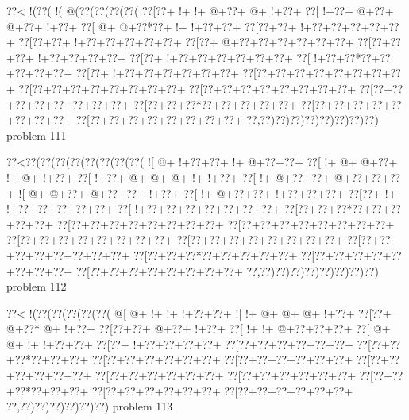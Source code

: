 \vbox{\vbox{\goo
\0??<\- !(\0??(\- !(\- @(\0??(\0??(\0??(\0??(
\0??[\0??+\- !+\- !+\- @+\0??+\- @+\- !+\0??+
\0??[\- !+\0??+\- @+\0??+\- @+\0??+\- !+\0??+
\0??[\- @+\- @+\0??*\0??+\- !+\- !+\0??+\0??+
\0??[\0??+\0??+\- !+\0??+\0??+\0??+\0??+\0??+
\0??[\0??+\0??+\- !+\0??+\0??+\0??+\0??+\0??+
\0??[\0??+\- @+\0??+\0??+\0??+\0??+\0??+\0??+
\0??[\0??+\0??+\0??+\- !+\0??+\0??+\0??+\0??+
\0??[\0??+\- !+\0??+\0??+\0??+\0??+\0??+\0??+
\0??[\- !+\0??+\0??*\0??+\0??+\0??+\0??+\0??+
\0??[\0??+\- !+\0??+\0??+\0??+\0??+\0??+\0??+
\0??[\0??+\0??+\0??+\0??+\0??+\0??+\0??+\0??+
\0??[\0??+\0??+\0??+\0??+\0??+\0??+\0??+\0??+
\0??[\0??+\0??+\0??+\0??+\0??+\0??+\0??+\0??+
\0??[\0??+\0??+\0??+\0??+\0??+\0??+\0??+\0??+
\0??[\0??+\0??+\0??*\0??+\0??+\0??+\0??+\0??+
\0??[\0??+\0??+\0??+\0??+\0??+\0??+\0??+\0??+
\0??[\0??+\0??+\0??+\0??+\0??+\0??+\0??+\0??+
\0??,\0??)\0??)\0??)\0??)\0??)\0??)\0??)\0??)
}
\hfil problem 111\hfil\break
}

\vbox{\vbox{\goo
\0??<\0??(\0??(\0??(\0??(\0??(\0??(\0??(\0??(
\- ![\- @+\- !+\0??+\0??+\- !+\- @+\0??+\0??+
\0??[\- !+\- @+\- @+\0??+\- !+\- @+\- !+\0??+
\0??[\- !+\0??+\- @+\- @+\- @+\- !+\- !+\0??+
\0??[\- !+\- @+\0??+\0??+\- @+\0??+\0??+\0??+
\- ![\- @+\- @+\0??+\- @+\0??+\0??+\- !+\0??+
\0??[\- !+\- @+\0??+\0??+\- !+\0??+\0??+\0??+
\0??[\0??+\- !+\- !+\0??+\0??+\0??+\0??+\0??+
\0??[\- !+\0??+\0??+\0??+\0??+\0??+\0??+\0??+
\0??[\0??+\0??+\0??*\0??+\0??+\0??+\0??+\0??+
\0??[\0??+\0??+\0??+\0??+\0??+\0??+\0??+\0??+
\0??[\0??+\0??+\0??+\0??+\0??+\0??+\0??+\0??+
\0??[\0??+\0??+\0??+\0??+\0??+\0??+\0??+\0??+
\0??[\0??+\0??+\0??+\0??+\0??+\0??+\0??+\0??+
\0??[\0??+\0??+\0??+\0??+\0??+\0??+\0??+\0??+
\0??[\0??+\0??+\0??*\0??+\0??+\0??+\0??+\0??+
\0??[\0??+\0??+\0??+\0??+\0??+\0??+\0??+\0??+
\0??[\0??+\0??+\0??+\0??+\0??+\0??+\0??+\0??+
\0??,\0??)\0??)\0??)\0??)\0??)\0??)\0??)\0??)
}
\hfil problem 112\hfil\break
}

\vbox{\vbox{\goo
\0??<\- !(\0??(\0??(\0??(\0??(\0??(
\- @[\- @+\- !+\- !+\- !+\0??+\0??+
\- ![\- !+\- @+\- @+\- @+\- !+\0??+
\0??[\0??+\- @+\0??*\- @+\- !+\0??+
\0??[\0??+\0??+\- @+\0??+\- !+\0??+
\0??[\- !+\- !+\- @+\0??+\0??+\0??+
\0??[\- @+\- @+\- !+\- !+\0??+\0??+
\0??[\0??+\- !+\0??+\0??+\0??+\0??+
\0??[\0??+\0??+\0??+\0??+\0??+\0??+
\0??[\0??+\0??+\0??*\0??+\0??+\0??+
\0??[\0??+\0??+\0??+\0??+\0??+\0??+
\0??[\0??+\0??+\0??+\0??+\0??+\0??+
\0??[\0??+\0??+\0??+\0??+\0??+\0??+
\0??[\0??+\0??+\0??+\0??+\0??+\0??+
\0??[\0??+\0??+\0??+\0??+\0??+\0??+
\0??[\0??+\0??+\0??*\0??+\0??+\0??+
\0??[\0??+\0??+\0??+\0??+\0??+\0??+
\0??[\0??+\0??+\0??+\0??+\0??+\0??+
\0??,\0??)\0??)\0??)\0??)\0??)\0??)
}
\hfil problem 113\hfil\break
}

